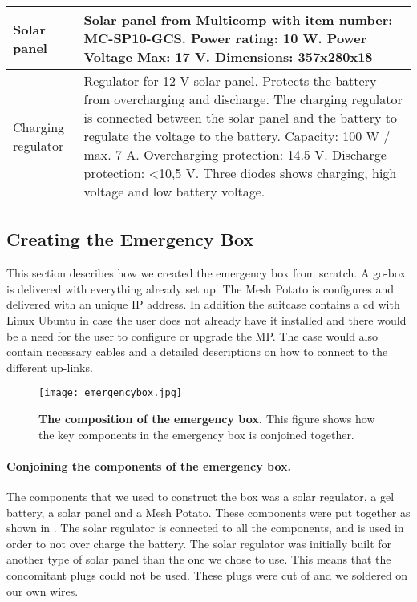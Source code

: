 \begin{center}
\begin{table}[h!]
\begin{tabular}{ | l | p{9cm} |}
	\hline
	Solar panel & Solar panel from Multicomp with item number: MC-SP10-GCS. Power rating: 10 W. Power Voltage Max: 17 V. Dimensions: 357x280x18\\
	\hline
	Charging regulator & Regulator for 12 V solar panel. Protects the battery from overcharging and discharge. The charging regulator is connected between the solar panel and the battery to regulate the voltage to the battery. Capacity: 100 W / max. 7 A. Overcharging protection: 14.5 V. Discharge protection: <10,5 V. Three diodes shows charging, high voltage and low battery voltage. \\
	\hline
    \end{tabular}
   \end{table}
\end{center}

\subsection{Creating the Emergency Box}
This section describes how we created the emergency box from scratch. A go-box is delivered with everything already set up. The Mesh Potato is configures and delivered with an unique IP address. In addition the suitcase contains a cd with Linux Ubuntu in case the user does not already have it installed and there would be a need for the user to configure or upgrade the MP. The case would also contain necessary cables and a detailed descriptions on how to connect to the different up-links. 

\begin{figure}[t]
  \centering
      \texttt{[image: emergencybox.jpg]}
  \caption [The composition of the emergency box]{\textbf{\textbf{The composition of the emergency box.}} This figure shows how the key components in the emergency box is conjoined together.}
  \label{fig:emergencybox}
\end{figure}

\paragraph{Conjoining the components of the emergency box.}
The components that we used to construct the box was a solar regulator, a gel battery, a solar panel and a Mesh Potato. These components were put together as shown in . The solar regulator is connected to all the components, and is used in order to not over charge the battery. The solar regulator was initially built for another type of solar panel than the one we chose to use. This means that the concomitant plugs could not be used. These plugs were cut of and we soldered on our own wires.  

